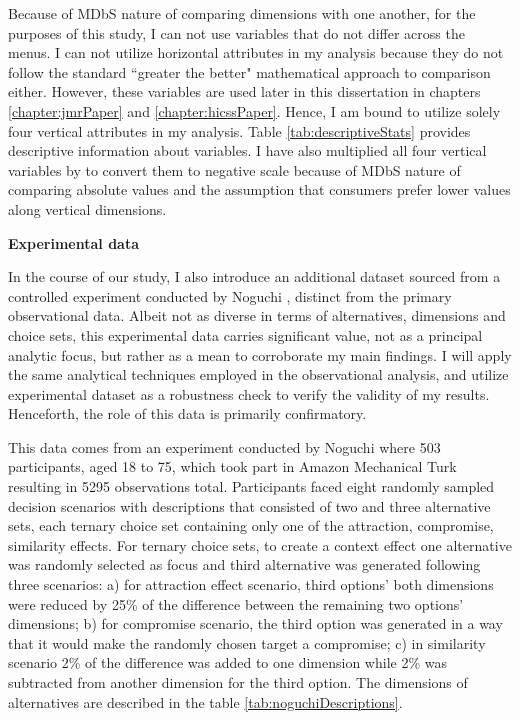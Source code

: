 \documentclass[a4paper,12pt]{article}
\newcommand{\citeyearonly}[1]{\citeyearpar{#1}}
\begin{document}
Because of MDbS nature of comparing dimensions with one another, for the purposes of this study, I can not use variables that do not differ across the menus. I can not utilize horizontal attributes in my analysis because they do not follow the standard ``greater the better" mathematical approach to comparison either. However, these variables are used later in this dissertation in chapters \ref{chapter:jmrPaper} and \ref{chapter:hicssPaper}. Hence, I am bound to utilize solely four vertical attributes in my analysis. Table \ref{tab:descriptiveStats} provides descriptive information about variables. I have also multiplied all four vertical variables by  to convert them to negative scale because of MDbS nature of comparing absolute values and the assumption that consumers prefer lower values along vertical dimensions.

\textbf{Experimental data}

In the course of our study, I also introduce an additional dataset sourced from a controlled experiment conducted by Noguchi \citeyearonly{noguchi2018multialternative}, distinct from the primary observational data. Albeit not as diverse in terms of alternatives, dimensions and choice sets, this experimental data carries significant value, not as a principal analytic focus, but rather as a mean to corroborate my main findings. I will apply the same analytical techniques employed in the observational analysis, and utilize experimental dataset as a robustness check to verify the validity of my results. Henceforth, the role of this data is primarily confirmatory.

This data comes from an experiment conducted by Noguchi \citeyearonly{noguchi2018multialternative} where 503 participants, aged 18 to 75, which took part in Amazon Mechanical Turk resulting in 5295 observations total. Participants faced eight randomly sampled decision scenarios with descriptions that consisted of two and three alternative sets, each ternary choice set containing only one of the attraction, compromise, similarity effects. For ternary choice sets, to create a context effect one alternative was randomly selected as focus and third alternative was generated following three scenarios: a) for attraction effect scenario, third options' both dimensions were reduced by 25\% of the difference between the remaining two options' dimensions; b) for compromise scenario, the third option was generated in a way that it would make the randomly chosen target a compromise; c) in similarity scenario 2\% of the difference was added to one dimension while 2\% was subtracted from another dimension for the third option. The dimensions of alternatives are described in the table \ref{tab:noguchiDescriptions}.
\end{document}
